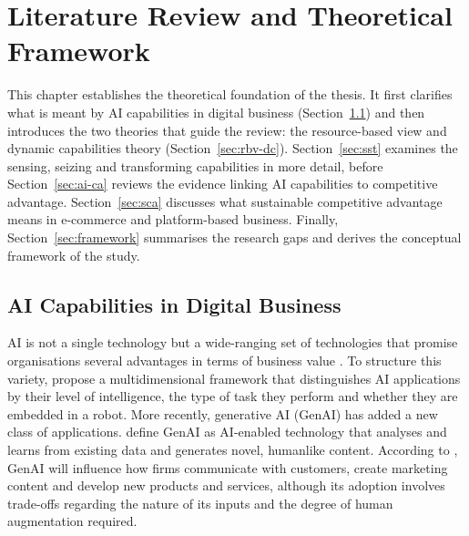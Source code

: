 
\chapter{Literature Review and Theoretical Framework}
\label{ch:literature}

This chapter establishes the theoretical foundation of the thesis. It first clarifies what is meant by AI capabilities in digital business (Section~\ref{sec:ai-capabilities}) and then introduces the two theories that guide the review: the resource-based view and dynamic capabilities theory (Section~\ref{sec:rbv-dc}). Section~\ref{sec:sst} examines the sensing, seizing and transforming capabilities in more detail, before Section~\ref{sec:ai-ca} reviews the evidence linking AI capabilities to competitive advantage. Section~\ref{sec:sca} discusses what sustainable competitive advantage means in e-commerce and platform-based business. Finally, Section~\ref{sec:framework} summarises the research gaps and derives the conceptual framework of the study.

\section{AI Capabilities in Digital Business}
\label{sec:ai-capabilities}

AI is not a single technology but a wide-ranging set of technologies that promise organisations several advantages in terms of business value \parencite[1709]{enholm2022}. To structure this variety, \textcite[24]{davenport2020} propose a multidimensional framework that distinguishes AI applications by their level of intelligence, the type of task they perform and whether they are embedded in a robot. More recently, generative AI (GenAI) has added a new class of applications. \textcite[583]{cui2024} define GenAI as AI-enabled technology that analyses and learns from existing data and generates novel, humanlike content. According to \textcite[702]{grewal2025}, GenAI will influence how firms communicate with customers, create marketing content and develop new products and services, although its adoption involves trade-offs regarding the nature of its inputs and the degree of human augmentation required.

